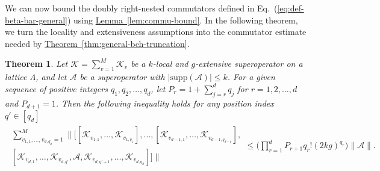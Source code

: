 \documentclass[aps,pra,reprint,groupedaddress,floatfix]{revtex4-2}
\newtheorem{theorem}{Theorem}
\newcommand{\eq}[1]{(\ref{eq:#1})}
\newcommand{\thm}[1]{\hyperref[thm:#1]{Theorem~\ref*{thm:#1}}}
\newcommand{\lem}[1]{\hyperref[lem:#1]{Lemma~\ref*{lem:#1}}}
\newcommand{\supp}{\mathrm{supp}}
\newcommand{\mc}{\mathcal}
\begin{document}
We can now bound the doubly right-nested commutators defined in Eq.~\eq{def-beta-bar-general} using \lem{commu-bound}. In the following theorem, we turn the locality and extensiveness assumptions into the commutator estimate needed by \thm{general-bch-truncation}.
\begin{theorem}\label{thm:doubly-nested-bound}
    Let $\mathcal{K} = \sum_{v=1}^{M} \mathcal{K}_{v}$ be a $k$-local and $g$-extensive superoperator on a lattice $\Lambda$, and let $\mathcal{A}$ be a superoperator with $|\supp(\mc A)|\le k$. For a given sequence of positive integers $q_1, q_2, \ldots, q_d$, let $P_{r} = 1+\sum_{j=r}^{d} q_j$ for $r=1, 2, \ldots, d$ and $P_{d+1}=1$. Then the following inequality holds for any position index $q' \in [q_d]$
    \begin{align}
    \label{eq:double-comm-k-local}
        \begin{multlined}
            \sum_{v_{1,1}, \ldots, v_{d, q_d}=1}^{M} \bigg\| \Big[ [\mathcal{K}_{v_{1,1}}, \ldots, \mathcal{K}_{v_{1, q_1}}], \ldots, [\mathcal{K}_{v_{d-1,1}}, \ldots, \mathcal{K}_{v_{d-1, q_{d-1}}}], \\
        [\mathcal{K}_{v_{d,1}}, \ldots, \mathcal{K}_{v_{d, q'}}, \mathcal{A}, \mathcal{K}_{v_{d, q'+1}}, \ldots, \mathcal{K}_{v_{d, q_d}}] \Big] \bigg\| 
        \end{multlined}\le \bigg(\prod_{r=1}^{d}P_{r+1} q_r!(2kg)^{q_r}\bigg)\|\mc A\|.
    \end{align}
\end{theorem}
\end{document}
